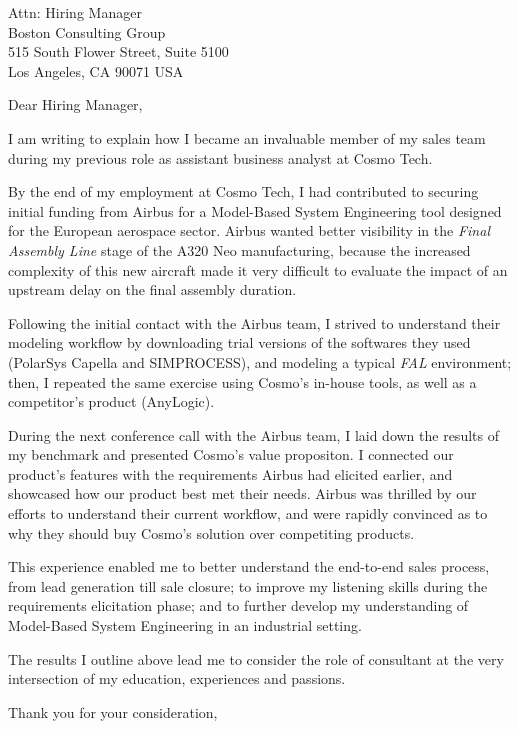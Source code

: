 \documentclass{letter}
\begin{document}
\signature{Marius Peter}
\longindentation=0pt
\address{Marius Peter\\
  519 Landfair Ave\\
  Los Angeles CA 90024
}


\begin{letter}{Attn: Hiring Manager\\
    Boston Consulting Group\\
    515 South Flower Street, Suite 5100\\
    Los Angeles, CA 90071 USA
  }

  \opening{\vfill Dear Hiring Manager,}
  
  I am writing to explain how I became an invaluable member of my sales team during my previous role as assistant business analyst at Cosmo Tech.

  By the end of my employment at Cosmo Tech, I had contributed to securing initial funding from Airbus for a Model-Based System Engineering tool designed for the European aerospace sector.
  Airbus wanted better visibility in the \textit{Final Assembly Line} stage of the A320 Neo manufacturing, because the increased complexity of this new aircraft made it very difficult to evaluate the impact of an upstream delay on the final assembly duration.

  Following the initial contact with the Airbus team, I strived to understand their modeling workflow by downloading trial versions of the softwares they used (PolarSys Capella and SIMPROCESS), and modeling a typical \textit{FAL} environment;
  then, I repeated the same exercise using Cosmo's in-house tools, as well as a competitor's product (AnyLogic).

  During the next conference call with the Airbus team, I laid down the results of my benchmark and presented Cosmo's value propositon.
  I connected our product's features with the requirements Airbus had elicited earlier, and showcased how our product best met their needs.
  Airbus was thrilled by our efforts to understand their current workflow, and were rapidly convinced as to why they should buy Cosmo's solution over competiting products.

  This experience enabled me to better understand the end-to-end sales process, from lead generation till sale closure;
  to improve my listening skills during the requirements elicitation phase;
  and to further develop my understanding of Model-Based System Engineering in an industrial setting. 

  The results I outline above lead me to consider the role of consultant at the very intersection of my education, experiences and passions.

  \closing{Thank you for your consideration,}

\end{letter}
\end{document}

